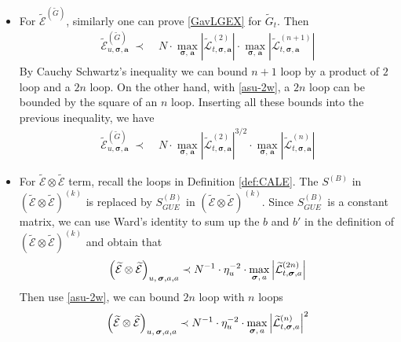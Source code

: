 \documentclass[10pt,reqno]{article}
\theoremstyle{plain} %
\theoremstyle{remark}
\numberwithin{equation}{section}
\begin{document}
\begin{itemize}
 \item For $\mathcal{\widetilde{E}}^{ (\widetilde{G})}$, similarly one can prove \eqref{GavLGEX} for $\widetilde{G}_t$. Then
 \begin{align}\label{WLK4}
       \mathcal{\widetilde{E}}^{ (\widetilde{G})}_{u, \boldsymbol{\sigma}, \textbf{a}}
       \;\prec\; & N\cdot  \max_{\boldsymbol{\sigma}, \,\textbf{a}}   \left| \mathcal{\widetilde{L}} ^{(2)}_{t, \boldsymbol{\sigma}, \textbf{a}}\right|\cdot \max_{\boldsymbol{\sigma}, \,\textbf{a}}  \left|\mathcal{\widetilde{L}} ^{(n+1)} _{t, \boldsymbol{\sigma}, \textbf{a}}\right|
        \end{align}   
 By Cauchy Schwartz's inequality we can bound $n+1$ loop by a product of 
$2$ loop and a $2n$ loop. On the other hand, with \eqref{asu-2w},  a $2n$ loop can be bounded by the square of an $n$ loop. Inserting all these bounds into the previous inequality, we have    
        \begin{align}\label{WLK5} 
        \mathcal{\widetilde{E}}^{ (\widetilde{G})}_{u, \boldsymbol{\sigma}, \textbf{a}}
       \;\prec\; &N\cdot  \max_{\boldsymbol{\sigma}, \,\textbf{a}}   \left| \mathcal{\widetilde{L}} ^{(2)}_{t, \boldsymbol{\sigma}, \textbf{a}}\right|^{3/2}\cdot \max_{\boldsymbol{\sigma}, \,\textbf{a}}   \left|\mathcal{\widetilde{L}} ^{(n )} _{t, \boldsymbol{\sigma}, \textbf{a}}\right|
      \end{align}
      \item For $\mathcal{\widetilde{E}} \otimes  \mathcal{\widetilde{E}}$ term, recall the loops in Definition \ref{def:CALE}. The $S^{(B)}$ in $(\mathcal{\widetilde{E}} \otimes  \mathcal{\widetilde{E}})^{(k)}$ is replaced by $S^{(B)}_{GUE}$ in  $(\mathcal{\widetilde{E}} \otimes  \mathcal{\widetilde{E}})^{(k)}$. Since $S_{GUE}^{(B)}$ is a constant matrix, we can use Ward's identity to sum up the $b$ and $b'$ in the definition of $(\mathcal{\widetilde{E}} \otimes  \mathcal{\widetilde{E}})^{(k)}$ and obtain that  
     \begin{equation}\label{WLK6}
      \left(\mathcal{\widetilde{E}} \otimes  \mathcal{\widetilde{E}} \right)
   _{u, \,\boldsymbol{\sigma},{\textbf a}, {\textbf a}}
   \prec N^{-1}\cdot \eta_u^{-2} \cdot \max_{\boldsymbol{\sigma}, \,\textbf{a}}   \left|\mathcal{\widetilde{L}} ^{(2n )} _{t, \boldsymbol{\sigma}, \textbf{a}}\right|
 \end{equation}
   Then use \eqref{asu-2w}, we can bound $2n $ loop with $n$ loops
   \begin{equation}\label{WLK7}
    \left(\mathcal{\widetilde{E}} \otimes  \mathcal{\widetilde{E}} \right)
   _{u, \,\boldsymbol{\sigma},{\textbf a}, {\textbf a}}\prec  N^{-1}\cdot \eta_u^{-2} \cdot \max_{\boldsymbol{\sigma}, \,\textbf{a}}   \left|\mathcal{\widetilde{L}} ^{( n )} _{t, \boldsymbol{\sigma}, \textbf{a}}\right|^2
\end{equation}
   \end{itemize}
\end{document}
